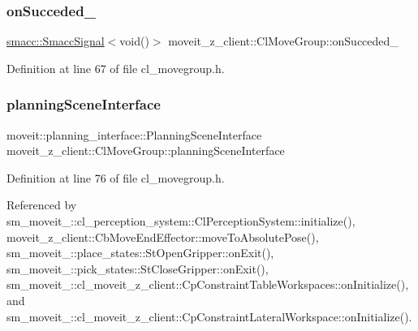 \subsubsection{\texorpdfstring{on\+Succeded\+\_\+}{onSucceded\_}}
{\footnotesize\ttfamily \hyperlink{classsmacc_1_1SmaccSignal}{smacc\+::\+Smacc\+Signal}$<$void()$>$ moveit\+\_\+z\+\_\+client\+::\+Cl\+Move\+Group\+::on\+Succeded\+\_\+\hspace{0.3cm}{\ttfamily [private]}}



Definition at line 67 of file cl\+\_\+movegroup.\+h.

\mbox{\label{classmoveit__z__client_1_1ClMoveGroup_a21c879b2683286aa21ce68f40195b4b5}} 
\subsubsection{\texorpdfstring{planning\+Scene\+Interface}{planningSceneInterface}}
{\footnotesize\ttfamily moveit\+::planning\+\_\+interface\+::\+Planning\+Scene\+Interface moveit\+\_\+z\+\_\+client\+::\+Cl\+Move\+Group\+::planning\+Scene\+Interface}



Definition at line 76 of file cl\+\_\+movegroup.\+h.



Referenced by sm\+\_\+moveit\+\_\+::cl\+\_\+perception\+\_\+system\+::\+Cl\+Perception\+System\+::initialize(), moveit\+\_\+z\+\_\+client\+::\+Cb\+Move\+End\+Effector\+::move\+To\+Absolute\+Pose(), sm\+\_\+moveit\+\_\+::place\+\_\+states\+::\+St\+Open\+Gripper\+::on\+Exit(), sm\+\_\+moveit\+\_\+::pick\+\_\+states\+::\+St\+Close\+Gripper\+::on\+Exit(), sm\+\_\+moveit\+\_\+::cl\+\_\+moveit\+\_\+z\+\_\+client\+::\+Cp\+Constraint\+Table\+Workspaces\+::on\+Initialize(), and sm\+\_\+moveit\+\_\+::cl\+\_\+moveit\+\_\+z\+\_\+client\+::\+Cp\+Constraint\+Lateral\+Workspace\+::on\+Initialize().

\mbox{\label{classmoveit__z__client_1_1ClMoveGroup_afecfdc1860dffea3331379b90d608154}} 

